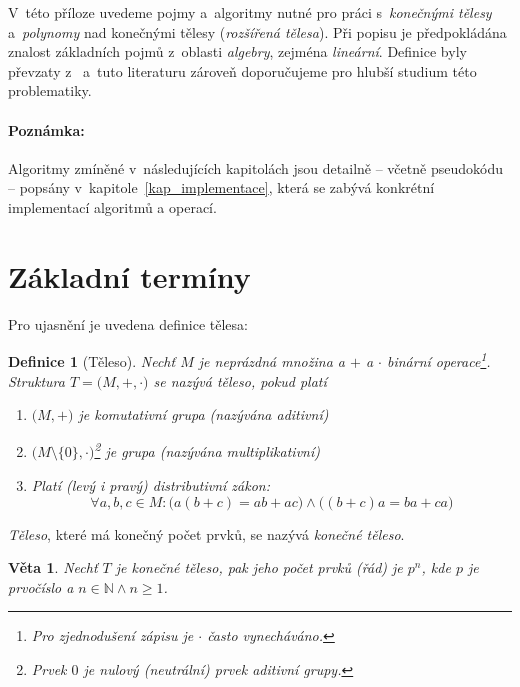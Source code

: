 \documentclass[thesis=M,czech,hidelinks]{FITthesis}[2012/06/26]
\newcommand{\0}{{\textcolor[gray]{0.75}{0}}}
\newtheorem{definice}{Definice}
\newtheorem{veta}{Věta}
\begin{document}
V~této příloze uvedeme pojmy a~algoritmy nutné pro práci s~\emph{konečnými
tělesy} a~\emph{polynomy} nad konečnými tělesy (\emph{rozšířená tělesa}). Při
popisu je předpokládána znalost základních pojmů z~oblasti \emph{algebry},
zejména \emph{lineární}. Definice byly převzaty z~\cite{Paar,Mares,Pytlicek}
a~tuto literaturu zároveň doporučujeme pro hlubší studium této problematiky.


\paragraph{Poznámka:} Algoritmy zmíněné v~následujících kapitolách jsou detailně
-- včetně pseudokódu -- popsány v~kapitole~\ref{kap_implementace}, která se
zabývá konkrétní implementací algoritmů a operací.



\section{Základní termíny}

Pro ujasnění je uvedena definice tělesa:

\begin{definice}[Těleso]
    Nechť $M$ je neprázdná množina a $+$ a $\cdot$ binární operace\footnote{
        Pro zjednodušení zápisu je $\cdot$ často vynecháváno.
    }. Struktura
    $T=\big(M, +, \cdot \big)$ se nazývá těleso, pokud platí
    \begin{enumerate}
        \item $\big(M, +\big)$ je \emph{komutativní grupa} (nazývána
            \emph{aditivní})
        \item $\big(M\setminus\{\mathit{0}\}, \cdot \big)$\footnote{
                Prvek $\mathit{0}$ je \emph{nulový} (\emph{neutrální}) prvek
                \emph{aditivní grupy}.
            } je \emph{grupa} (nazývána
            \emph{multiplikativní})
        \item Platí (levý i pravý) \emph{distributivní zákon}:
            $$
                \forall a,b,c \in M :
                \big( a(b+c) = a b + a c \big) \land
                \big( (b+c)a = b a + c a \big)
            $$

    \end{enumerate}
\end{definice}
\emph{Těleso}, které má konečný počet prvků, se nazývá \emph{konečné těleso}.

\begin{veta}
    Nechť $T$ je \emph{konečné těleso}, pak jeho počet prvků (\emph{řád}) je
    $p^n$, kde $p$ je prvočíslo a $n \in \mathbb{N} \land n \geq 1 $.
\end{veta}
\end{document}
